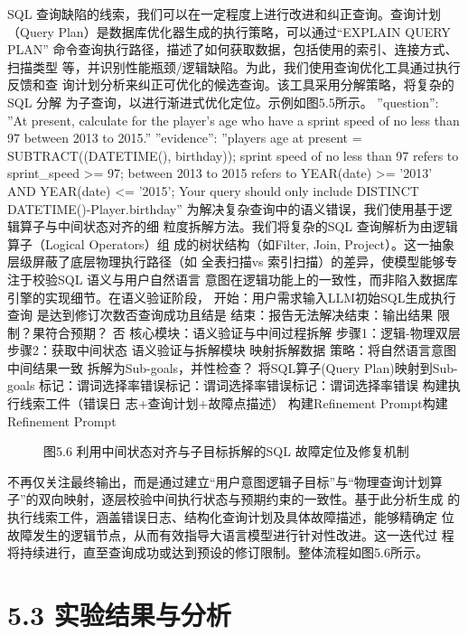 \documentclass[12pt,a4paper,openright,UTF8]{ctexbook}
\begin{document}
SQL 查询缺陷的线索，我们可以在一定程度上进行改进和纠正查询。查询计划 （Query Plan）是数据库优化器生成的执行策略，可以通过“EXPLAIN QUERY PLAN” 命令查询执行路径，描述了如何获取数据，包括使用的索引、连接方式、扫描类型 等，并识别性能瓶颈/逻辑缺陷。为此，我们使用查询优化工具通过执行反馈和查 询计划分析来纠正可优化的候选查询。该工具采用分解策略，将复杂的SQL 分解 为子查询，以进行渐进式优化定位。示例如图5.5所示。 ”question”: ”At present, calculate for the player’s age who have a sprint speed of no less than 97 between 2013 to 2015.” ”evidence”: ”players age at present = SUBTRACT((DATETIME(), birthday)); sprint speed of no less than 97 refers to sprint\_speed >= 97; between 2013 to 2015 refers to YEAR(date) >= ’2013’ AND YEAR(date) <= ’2015’; Your query should only include DISTINCT DATETIME()-Player.birthday” 为解决复杂查询中的语义错误，我们使用基于逻辑算子与中间状态对齐的细 粒度拆解方法。我们将复杂的SQL 查询解析为由逻辑算子（Logical Operators）组 成的树状结构（如Filter, Join, Project）。这一抽象层级屏蔽了底层物理执行路径（如 全表扫描vs 索引扫描）的差异，使模型能够专注于校验SQL 语义与用户自然语言 意图在逻辑功能上的一致性，而非陷入数据库引擎的实现细节。在语义验证阶段， 开始：用户需求输入LLM初始SQL生成执行查询 是达到修订次数否查询成功且结是 结束：报告无法解决结束：输出结果 限制？果符合预期？ 否 核心模块：语义验证与中间过程拆解 步骤1：逻辑-物理双层步骤2：获取中间状态 语义验证与拆解模块 映射拆解数据 策略：将自然语言意图中间结果一致 拆解为Sub-goals，并性检查？ 将SQL算子(Query Plan)映射到Sub-goals 标记：谓词选择率错误标记：谓词选择率错误标记：谓词选择率错误 构建执行线索工件（错误日 志+查询计划+故障点描述） 构建Refinement Prompt构建Refinement Prompt

\begin{figure}[htbp]
\centering
{}
\caption{图5.6 利用中间状态对齐与子目标拆解的SQL 故障定位及修复机制}
\end{figure}

不再仅关注最终输出，而是通过建立“用户意图逻辑子目标”与“物理查询计划算 子”的双向映射，逐层校验中间执行状态与预期约束的一致性。基于此分析生成 的执行线索工件，涵盖错误日志、结构化查询计划及具体故障描述，能够精确定 位故障发生的逻辑节点，从而有效指导大语言模型进行针对性改进。这一迭代过 程将持续进行，直至查询成功或达到预设的修订限制。整体流程如图5.6所示。

\section{5.3 实验结果与分析}
\end{document}
